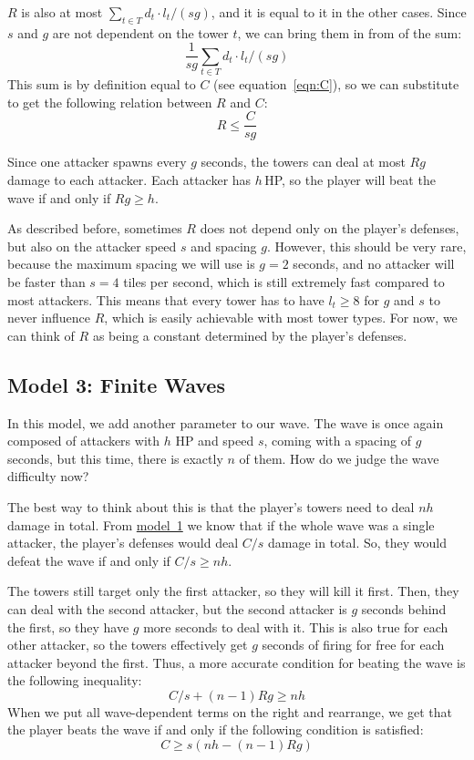 $R$ is also at most $\sum_{t \in T} d_t \cdot l_t / (s g)$, and it is equal to it in the other cases.
Since $s$ and $g$ are not dependent on the tower $t$, we can bring them in from of the sum:
\begin{equation}
    \frac{1}{s g} \sum_{t \in T} d_t \cdot l_t / (s g)
\end{equation}
This sum is by definition equal to $C$ (see equation~\ref{eqn:C}), so we can substitute to get the following relation between $R$ and $C$:
\begin{equation}\label{eqn:RC}
    R \leq \frac{C}{s g}
\end{equation}

Since one attacker spawns every $g$ seconds, the towers can deal at most $Rg$ damage to each attacker.
Each attacker has $h$\,HP, so the player will beat the wave if and only if $Rg \geq h$.

As described before, sometimes $R$ does not depend only on the player's defenses, but also on the attacker speed $s$ and spacing $g$.
However, this should be very rare, because the maximum spacing we will use is $g=2$ seconds, and no attacker will be faster than $s=4$ tiles per second, which is still extremely fast compared to most attackers.
This means that every tower has to have $l_t \geq 8$ for $g$ and $s$ to never influence $R$, which is easily achievable with most tower types.
For now, we can think of $R$ as being a constant determined by the player's defenses.

\subsection{Model 3: Finite Waves}\label{sec:analysis-waves-finite}
In this model, we add another parameter to our wave.
The wave is once again composed of attackers with $h$ HP and speed $s$, coming with a spacing of $g$ seconds, but this time, there is exactly $n$ of them.
How do we judge the wave difficulty now?

The best way to think about this is that the player's towers need to deal $nh$ damage in total.
From \hyperref[sec:analysis-waves-single]{model~1} we know that if the whole wave was a single attacker, the player's defenses would deal $C/s$ damage in total.
So, they would defeat the wave if and only if $C/s \geq nh$.

The towers still target only the first attacker, so they will kill it first.
Then, they can deal with the second attacker, but the second attacker is $g$ seconds behind the first, so they have $g$ more seconds to deal with it.
This is also true for each other attacker, so the towers effectively get $g$ seconds of firing for free for each attacker beyond the first.
Thus, a more accurate condition for beating the wave is the following inequality:
\begin{equation*}
    C/s + (n-1) R g \geq nh
\end{equation*}
When we put all wave-dependent terms on the right and rearrange, we get that the player beats the wave if and only if the following condition is satisfied:
\begin{equation}\label{eqn:beat-finite-wave}
    C \geq s(nh - (n - 1)Rg)
\end{equation}

